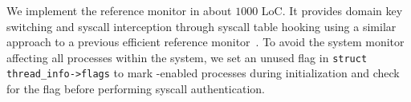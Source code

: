 We implement the reference monitor in about $1000$ LoC. It provides domain key switching and \gls{syscall} interception through \gls{syscall} table hooking using a similar approach to a previous efficient reference monitor~\cite{jenny}.
To avoid the system monitor affecting all processes within the system, we set an unused flag in \texttt{struct thread\_info->flags} to mark \thename-enabled processes during initialization and check for the flag before performing syscall authentication.






%
%






